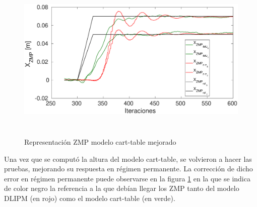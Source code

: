 \begin{figure}[H]
\centering
\includegraphics[width=13cm, height=8cm]{imagenes/apartado_5/517_evol_mejora_cart_table}
\caption{Representación ZMP modelo cart-table mejorado}
\label{figura517}
\end{figure}

Una vez que se computó la altura del modelo cart-table, se volvieron a hacer las pruebas, mejorando su respuesta en régimen permanente. La corrección de dicho error en régimen permanente puede observarse en la figura \ref{figura517} en la que se indica de color negro la referencia a la que debían llegar los ZMP tanto del modelo DLIPM (en rojo) como el modelo cart-table (en verde).


\afterpage{\null\newpage}
\newpage
